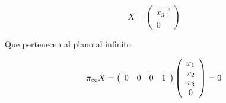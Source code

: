 \begin{equation*}
X = 
\left(
\begin{array}{c}
  \vec{x_{3,1}} \\ 
  0
\end{array}
\right) 
\end{equation*} 

Que pertenecen al plano al infinito.

\begin{equation*}
\pi_\infty X = 
\left(
\begin{array}{c c c c}
  0 & 0 & 0 & 1
\end{array}
\right) 
\left(
\begin{array}{c}
  x_1 \\ 
  x_2 \\ 
  x_3 \\
  0
\end{array}
\right) 
=0
\end{equation*} 
